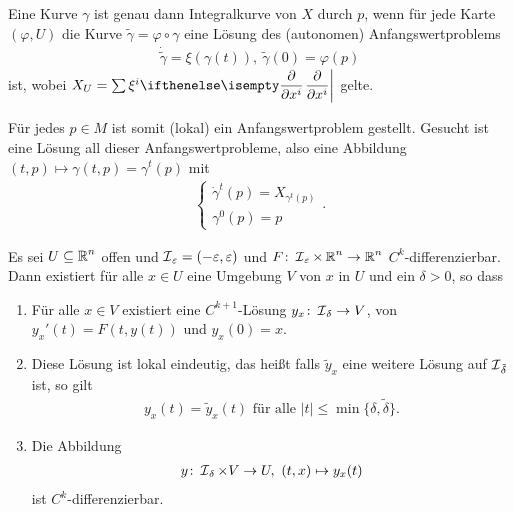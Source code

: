 \begin{bem*}
  Eine Kurve $\gamma$ ist genau dann Integralkurve von $X$ durch $p$, wenn für jede Karte $(\varphi,U)$ die Kurve $\tilde \gamma = \varphi \circ \gamma$ eine Lösung des (autonomen) Anfangswertproblems
  \begin{align*}
    \dot{\tilde \gamma} = \xi(\gamma(t)),  \ \tilde \gamma(0) = \varphi(p)
  \end{align*}
  ist, wobei $X_U = \sum \xi^i \pdifffrac{}{x^i}$ gelte.

  Für jedes $p \in M$ ist somit (lokal) ein Anfangswertproblem gestellt. Gesucht ist eine  Lösung all dieser Anfangswertprobleme, also eine Abbildung $(t,p) \mapsto \gamma(t,p) = \gamma^t(p)$ mit 
  \begin{align*}
    \begin{cases}
      \dot \gamma^t(p) = X_{\gamma^t(p)}\\
      \gamma^0(p) = p
    \end{cases}.
  \end{align*}
\end{bem*}

\begin{satz}
  Es sei $U \subseteq \operatorname{\mathbb{R}}^n$ offen und $\operatorname{\mathcal{I}}_{\varepsilon}=(-\varepsilon,\varepsilon)$ und $F \colon \operatorname{\mathcal{I}}_{\varepsilon} \times \operatorname{\mathbb{R}}^n \to \operatorname{\mathbb{R}}^n$ $C^k$-differenzierbar.
  Dann existiert für alle $x \in U$ eine Umgebung $V$ von $x$ in $U$ und ein $\delta > 0$, so dass
  \begin{enumerate}[label=(\roman*),leftmargin=*,widest=iii]
  \item Für alle $x \in V$ existiert eine $C^{k+1}$-Lösung $y_x\colon \operatorname{\mathcal{I}}_{\delta} \to V$, von $y_x'(t)=F(t,y(t))$ und $y_x(0) = x$.
  \item Diese Lösung ist lokal eindeutig, das hei\ss t falls $\tilde y_x$ eine weitere Lösung auf $\operatorname{\mathcal{I}}_{\tilde\delta}$ ist, so gilt
    \begin{align*}
      y_x(t) = \tilde y_x(t) \text{ für alle } |t| \leq \min\{\delta, \tilde\delta\}.
    \end{align*}
  \item Die Abbildung 
    \begin{align*}
      y\colon \operatorname{\mathcal{I}}_{\delta} \times V \to U, \ (t,x) \mapsto y_x(t)
    \end{align*}
    ist $C^k$-differenzierbar.
  \end{enumerate}
\end{satz}


